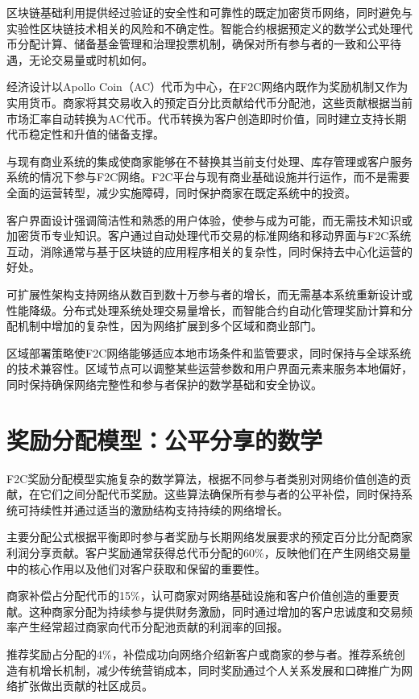 \documentclass[
  Letterpaper,
]{scrbook}
\begin{document}
区块链基础利用提供经过验证的安全性和可靠性的既定加密货币网络，同时避免与实验性区块链技术相关的风险和不确定性。智能合约根据预定义的数学公式处理代币分配计算、储备基金管理和治理投票机制，确保对所有参与者的一致和公平待遇，无论交易量或时机如何。

经济设计以Apollo
Coin（AC）代币为中心，在F2C网络内既作为奖励机制又作为实用货币。商家将其交易收入的预定百分比贡献给代币分配池，这些贡献根据当前市场汇率自动转换为AC代币。代币转换为客户创造即时价值，同时建立支持长期代币稳定性和升值的储备支撑。

与现有商业系统的集成使商家能够在不替换其当前支付处理、库存管理或客户服务系统的情况下参与F2C网络。F2C平台与现有商业基础设施并行运作，而不是需要全面的运营转型，减少实施障碍，同时保护商家在既定系统中的投资。

客户界面设计强调简洁性和熟悉的用户体验，使参与成为可能，而无需技术知识或加密货币专业知识。客户通过自动处理代币交易的标准网络和移动界面与F2C系统互动，消除通常与基于区块链的应用程序相关的复杂性，同时保持去中心化运营的好处。

可扩展性架构支持网络从数百到数十万参与者的增长，而无需基本系统重新设计或性能降级。分布式处理系统处理交易量增长，而智能合约自动化管理奖励计算和分配机制中增加的复杂性，因为网络扩展到多个区域和商业部门。

区域部署策略使F2C网络能够适应本地市场条件和监管要求，同时保持与全球系统的技术兼容性。区域节点可以调整某些运营参数和用户界面元素来服务本地偏好，同时保持确保网络完整性和参与者保护的数学基础和安全协议。

\section{奖励分配模型：公平分享的数学}\label{ux5956ux52b1ux5206ux914dux6a21ux578bux516cux5e73ux5206ux4eabux7684ux6570ux5b66}

F2C奖励分配模型实施复杂的数学算法，根据不同参与者类别对网络价值创造的贡献，在它们之间分配代币奖励。这些算法确保所有参与者的公平补偿，同时保持系统可持续性并通过适当的激励结构支持持续的网络增长。

主要分配公式根据平衡即时参与者奖励与长期网络发展要求的预定百分比分配商家利润分享贡献。客户奖励通常获得总代币分配的60\%，反映他们在产生网络交易量中的核心作用以及他们对客户获取和保留的重要性。

商家补偿占分配代币的15\%，认可商家对网络基础设施和客户价值创造的重要贡献。这种商家分配为持续参与提供财务激励，同时通过增加的客户忠诚度和交易频率产生经常超过商家向代币分配池贡献的利润率的回报。

推荐奖励占分配的4\%，补偿成功向网络介绍新客户或商家的参与者。推荐系统创造有机增长机制，减少传统营销成本，同时奖励通过个人关系发展和口碑推广为网络扩张做出贡献的社区成员。
\end{document}
